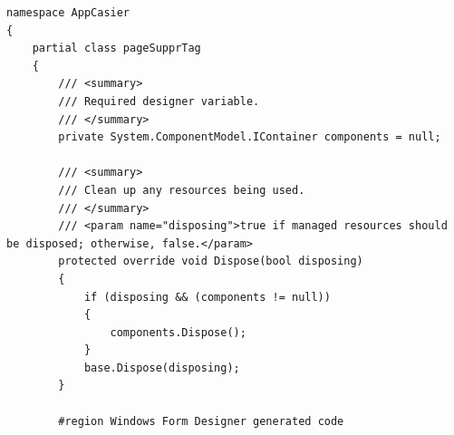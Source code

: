 \documentclass[main.tex]{subfiles}
\begin{document}
\begin{lstlisting}
namespace AppCasier
{
    partial class pageSupprTag
    {
        /// <summary>
        /// Required designer variable.
        /// </summary>
        private System.ComponentModel.IContainer components = null;

        /// <summary>
        /// Clean up any resources being used.
        /// </summary>
        /// <param name="disposing">true if managed resources should be disposed; otherwise, false.</param>
        protected override void Dispose(bool disposing)
        {
            if (disposing && (components != null))
            {
                components.Dispose();
            }
            base.Dispose(disposing);
        }

        #region Windows Form Designer generated code


\end{lstlisting}
\end{document}
